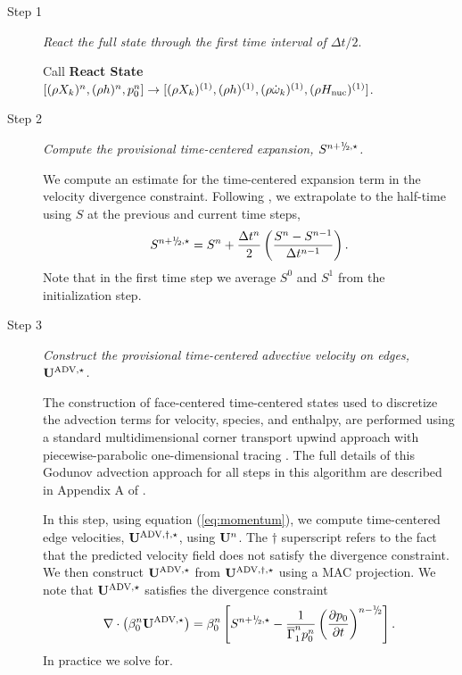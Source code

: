 \documentclass{aastex62}
\newcommand{\sfrac}[2]{\mathchoice
  {\kern0em\raise.5ex\hbox{\the\scriptfont0 #1}\kern-.15em/
   \kern-.15em\lower.25ex\hbox{\the\scriptfont0 #2}}
  {\kern0em\raise.5ex\hbox{\the\scriptfont0 #1}\kern-.15em/
   \kern-.15em\lower.25ex\hbox{\the\scriptfont0 #2}}
  {\kern0em\raise.5ex\hbox{\the\scriptscriptfont0 #1}\kern-.2em/
   \kern-.15em\lower.25ex\hbox{\the\scriptscriptfont0 #2}}
  {#1\!/#2}}
\newcommand{\myhalf}{\sfrac{1}{2}}
\newcommand{\Ub}{{\bf{U}}}
\newcommand{\dt}{\Delta t}
\newcommand{\gammaonebar}{\overline{\Gamma}_1}
\newcommand{\Hnuc}{H_{\rm nuc}}
\newcommand{\omegadot}{\dot\omega}
\newcommand{\nph}{{n+\myhalf}}
\newcommand{\uadvone}{\Ub^{\mathrm{ADV},\star}}
\newcommand{\uadvonedag}{\Ub^{\mathrm{ADV},\dagger,\star}}
\begin{document}
\begin{description}

\item[Step 1] {\em React the full state through the first time interval of $\dt / 2.$}

Call {\bf React State}$[(\rho X_k)^n, (\rho h)^n, p_0^n] \rightarrow [(\rho X_k)^{(1)}, (\rho h)^{(1)}, (\rho \omegadot_k)^{(1)}, (\rho \Hnuc)^{(1)}]$.


\item[Step 2] {\em Compute the provisional time-centered expansion,
    $S^{\nph,\star}$.}

We compute an estimate for the time-centered expansion term in the velocity
divergence constraint.  Following \citet{Bell:2004}, we extrapolate
to the half-time using $S$ at the previous and current
time steps,
\begin{equation}
S^{\nph,\star} = S^n + \frac{\dt^n}{2} \left(\frac{S^n - S^{n-1}}{\dt^{n-1}}\right).
\end{equation}
Note that in the first time step we average $S^0$ and $S^1$ from the
initialization step.

\item[Step 3] {\em Construct the provisional time-centered advective velocity on
edges, $\uadvone$.}

The construction of face-centered time-centered states used to discretize the
advection terms for velocity, species, and enthalpy, are performed using
a standard multidimensional corner transport upwind approach
\citep{colella1990multidimensional,saltzman1994unsplit} with piecewise-parabolic
one-dimensional tracing \citep{colella1984piecewise}.  The full details of this
Godunov advection approach for all steps in this algorithm are described 
in Appendix A of \cite{XRB_III}.

In this step, using equation (\ref{eq:momentum}), 
we compute time-centered edge velocities, $\uadvonedag$, using
$\Ub^n$.  The $\dagger$ superscript refers to the
fact that the predicted velocity field does not satisfy the divergence
constraint.  We then construct $\uadvone$ from $\uadvonedag$
using a MAC projection.
We note that $\uadvone$ satisfies the divergence constraint
\begin{equation}
\nabla \cdot \left(\beta_0^n \uadvone\right) = \beta_0^n \left[S^{\nph,\star} - \frac{1}{\gammaonebar^np_0^n}\left(\frac{\partial p_0}{\partial t}\right)^{n-\myhalf} \right].\label{eq:div1}
\end{equation}
In practice we solve for.


\end{description}
\end{document}
